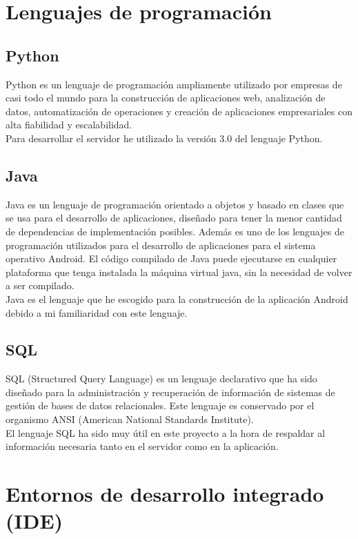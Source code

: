 \section{Lenguajes de programación}

\subsection{Python}

Python es un lenguaje de programación ampliamente utilizado por empresas de casi todo el mundo para la construcción de aplicaciones web, analización de datos, automatización de operaciones y creación de aplicaciones empresariales con alta fiabilidad y escalabilidad.\\
Para desarrollar el servidor he utilizado la versión 3.0 del lenguaje Python.

\subsection{Java}

Java es un lenguaje de programación orientado a objetos y basado en clases que se usa para el desarrollo de aplicaciones, diseñado para tener la menor cantidad de dependencias de implementación posibles. Además es uno de los lenguajes de programación utilizados para el desarrollo de aplicaciones para el sistema operativo Android. El código compilado de Java puede ejecutarse en cualquier plataforma que tenga instalada la máquina virtual java, sin la necesidad de volver a ser compilado.\\
Java es el lenguaje que he escogido para la construcción de la aplicación Android debido a mi familiaridad con este lenguaje.

\subsection{SQL}

SQL (Structured Query Language) es un lenguaje declarativo que ha sido diseñado para la administración y recuperación de información de sistemas de gestión de bases de datos relacionales. Este lenguaje es conservado por el organismo ANSI (American National Standards Institute).\\
El lenguaje SQL ha sido muy útil en este proyecto a la hora de respaldar al información necesaria tanto en el servidor como en la aplicación.



\section{Entornos de desarrollo integrado (IDE)}

